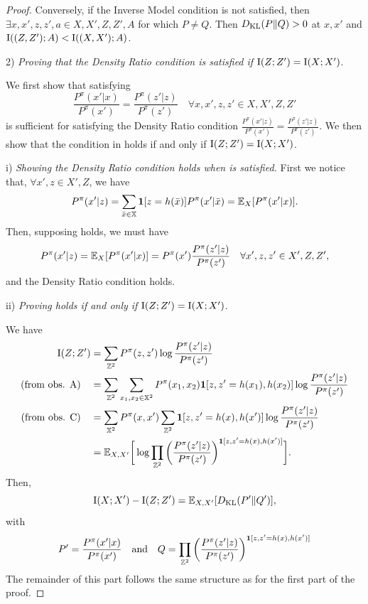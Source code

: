 \begin{proof}
Conversely, if the Inverse Model condition is not satisfied, then $\exists x,x',z,z',a\in X,X',Z,Z',A$ for which $P\neq Q$. Then $D_{\mathrm{KL}} (P \Vert Q)>0$ at $x,x'$ and $\text{I}((Z,Z');A)<\text{I}((X,X');A)$. 

2) \textit{Proving that the Density Ratio condition is satisfied if} $\text{I}(Z;Z')=\text{I}(X;X')$.

We first show that satisfying 
\begin{equation}\label{c2:eq:sufficient_cond_density_ratio}
    \frac{P^\pi(x'|x)}{P^\pi(x')}=\frac{P^\pi(z'|z)}{P^\pi(z')} \quad \forall x,x',z,z'\in X,X',Z,Z'
\end{equation}
is sufficient for satisfying the Density Ratio condition $\frac{P^\pi(x'|z)}{P^\pi(x')}=\frac{P^\pi(z'|z)}{P^\pi(z')}$. We then show that the condition in  holds if and only if $\text{I}(Z;Z')=\text{I}(X;X')$.

i) \textit{Showing the Density Ratio condition holds when   is satisfied.}
First we notice that, $\forall x',z \in X',Z$, we have
\begin{equation*}
    P^\pi(x'|z) = \sum_{\bar{x}\in {\mathbb{X}}} \bm{1}[z=h(\bar{x})]P^\pi(x'|\bar{x}) = \mathbb{E}_X [P^\pi(x'|x)].
\end{equation*}
Then, supposing  holds, we must have
\begin{equation*}
   P^\pi(x'|z) = \mathbb{E}_X [P^\pi(x'|x)] = P^\pi(x') \frac{P^\pi(z'|z)}{P^\pi(z')} \quad \forall x',z,z'\in X',Z,Z',
\end{equation*}
and the Density Ratio condition holds.

ii) \textit{Proving  holds if and only if} $\text{I}(Z;Z')=\text{I}(X;X')$.

We have
\begin{align*}
\text{I}(Z;Z') &= \sum_{{\mathbb{Z}}^2} P^\pi (z,z') \log\frac{P^\pi(z'|z)}{P^\pi(z')}\\
\text{(from obs. A)} \quad  &=  \sum_{{\mathbb{Z}}^2} \sum_{x_1,x_2\in {\mathbb{X}}^2}  P^\pi (x_1,x_2) \bm{1}[z,z'=h(x_1),h(x_2)] \log\frac{P^\pi(z'|z)}{P^\pi(z')}\\
\text{(from obs. C)} \quad &= \sum_{{\mathbb{X}}^2} P^\pi (x,x') \sum_{{\mathbb{Z}}^2} \bm{1}[z,z'=h(x),h(x')] \log\frac{P^\pi(z'|z)}{P^\pi(z')}\\
&= \mathbb{E}_{X,X'} \bigg[\log \prod_{{\mathbb{Z}}^2} \bigg(\frac{P^\pi(z'|z)}{P^\pi(z')}\bigg)^{\bm{1}[z,z'=h(x),h(x')]}\bigg].
\end{align*}
Then,
\begin{equation*}
    \text{I}(X;X')- \text{I}(Z;Z') = \mathbb{E}_{X,X'}[ D_{\mathrm{KL}} (P' \Vert Q')],
\end{equation*}
with
\begin{equation*}
    P'=\frac{P^\pi(x'|x)}{P^\pi(x')} \quad \text{and} \quad Q=\prod_{{\mathbb{Z}}^2}\bigg(\frac{P^\pi(z'|z)}{P^\pi(z')}\bigg)^{\bm{1}[z,z'=h(x),h(x')]}
\end{equation*}
The remainder of this part follows the same structure as for the first part of the proof. 


\end{proof}
